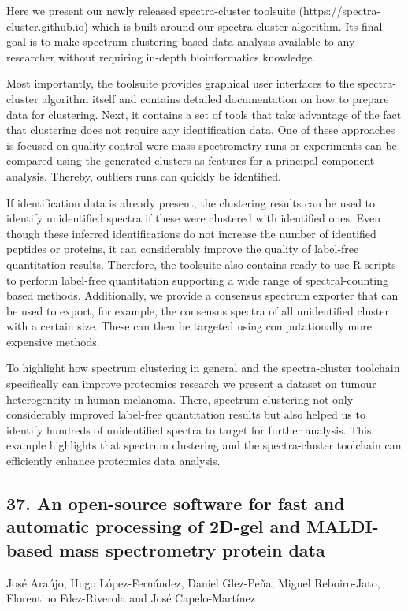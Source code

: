 Here we present our newly released spectra-cluster toolsuite (https://spectra-cluster.github.io) which is built around our spectra-cluster algorithm. Its final goal is to make spectrum clustering based data analysis available to any researcher without requiring in-depth bioinformatics knowledge.

Most importantly, the toolsuite provides graphical user interfaces to the spectra-cluster algorithm itself and contains detailed documentation on how to prepare data for clustering. Next, it contains a set of tools that take advantage of the fact that clustering does not require any identification data. One of these approaches is focused on quality control were mass spectrometry runs or experiments can be compared using the generated clusters as features for a principal component analysis. Thereby, outliers runs can quickly be identified.

If identification data is already present, the clustering results can be used to identify unidentified spectra if these were clustered with identified ones. Even though these inferred identifications do not increase the number of identified peptides or proteins, it can considerably improve the quality of label-free quantitation results. Therefore, the toolsuite also contains ready-to-use R scripts to perform label-free quantitation supporting a wide range of spectral-counting based methods. Additionally, we provide a consensus spectrum exporter that can be used to export, for example, the consensus spectra of all unidentified cluster with a certain size. These can then be targeted using computationally more expensive methods.

To highlight how spectrum clustering in general and the spectra-cluster toolchain specifically can improve proteomics research we present a dataset on tumour heterogeneity in human melanoma. There, spectrum clustering not only considerably improved label-free quantitation results but also helped us to identify hundreds of unidentified spectra to target for further analysis. This example highlights that spectrum clustering and the spectra-cluster toolchain can efficiently enhance proteomics data analysis.

\subsection*{\color{eubicRed} 37. An open-source software for fast and automatic processing of 2D-gel and MALDI-based mass spectrometry protein data}
{\color{eubicGray}José Araújo, Hugo López-Fernández, Daniel Glez-Peña, Miguel Reboiro-Jato, Florentino Fdez-Riverola and José Capelo-Martínez}


